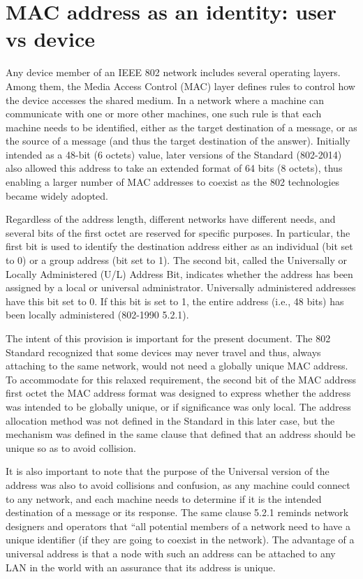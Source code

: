 \documentclass[10pt]{article}
\begin{document}
\section{MAC address as an identity: user vs device}{
	Any device member of an IEEE 802 network includes several operating layers. Among them, the Media Access Control (MAC) layer defines rules to control how the device accesses the shared medium. In a network where a machine can communicate with one or more other machines, one such rule is that each machine needs to be identified, either as the target destination of a message, or as the source of a message (and thus the target destination of the answer). Initially intended as a 48-bit (6 octets) value, later versions of the Standard (802-2014) also allowed this address to take an extended format of 64 bits (8 octets), thus enabling a larger number of MAC addresses to coexist as the 802 technologies became widely adopted.
	
	Regardless of the address length, different networks have different needs, and several bits of the first octet are reserved for specific purposes. In particular, the first bit is used to identify the destination address either as an individual (bit set to 0) or a group address (bit set to 1). The second bit, called the Universally or Locally Administered (U/L) Address Bit, indicates whether the address has been assigned by a local or universal administrator. Universally administered addresses have this bit set to 0. If this bit is set to 1, the entire address (i.e., 48 bits) has been locally administered (802-1990 5.2.1).
	
	The intent of this provision is important for the present document. The 802 Standard recognized that some devices may never travel and thus, always attaching to the same network, would not need a globally unique MAC address. To accommodate for this relaxed requirement, the second bit of the MAC address first octet the MAC address format was designed to express whether the address was intended to be globally unique, or if significance was only local. The address allocation method was not defined in the Standard in this later case, but the mechanism was defined in the same clause that defined that an address should be unique so as to avoid collision.
	
	It is also important to note that the purpose of the Universal version of the address was also to avoid collisions and confusion, as any machine could connect to any network, and each machine needs to determine if it is the intended destination of a message or its response. The same clause 5.2.1 reminds network designers and operators that “all potential members of a network need to have a unique identifier (if they are going to coexist in the network). The advantage of a universal address is that a node with such an address can be attached to any LAN in the world with an assurance that its address is unique.
	
}
\end{document}
